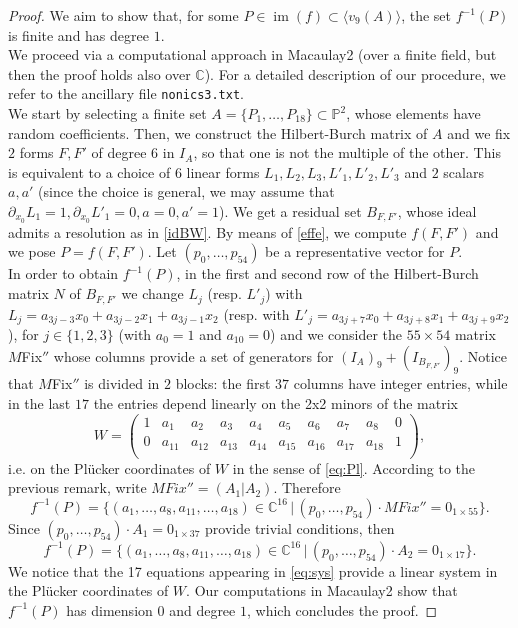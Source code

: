 \documentclass{amsart}
\newcommand{\C}{\mathbb{C}}
\newcommand{\Pj}{\mathbb{P}}
\newcommand{\imm}{\operatorname{im}}
\theoremstyle{definition}
\begin{document}
\begin{proof}
We aim to show that, for some $ P \in \imm(f) \subset \langle v_9(A) \rangle $, the set $ f^{-1}(P) $ is finite and has degree $ 1 $. \\
We proceed via a computational approach in Macaulay2 \cite{Macaulay2} (over a finite field, but then the proof holds
also over $\C$). For a detailed description of our procedure, we refer to the ancillary file \texttt{nonics3.txt}. \\
We start by selecting a finite set $ A = \{P_1,\ldots,P_{18}\} \subset \Pj^2 $, whose elements have random coefficients. 
Then, we construct the Hilbert-Burch matrix of $ A $ and we fix $ 2 $ forms $ F, F' $ of degree $ 6 $ in $ I_{A} $, so that one is not the multiple of the other.
This is equivalent to a choice of $ 6 $ linear forms $ L_{1}, L_{2}, L_{3}, L'_{1}, L'_{2}, L'_{3} $ and $ 2 $ scalars $ a, a' $ 
(since the choice is general, we may assume that $ \partial_{x_{0}} L_{1} = 1, \partial_{x_{0}} L'_{1} = 0, a = 0, a' = 1 $). We get a residual set $ B_{F,F'} $, 
whose ideal admits a resolution as in \eqref{idBW}.
By means of \eqref{effe}, we compute $ f(F,F') $ and we pose $ P = f(F,F') $. Let $ (p_{0}, \ldots, p_{54}) $ be a representative vector for  $ P $. \\
In order to obtain $ f^{-1}(P) $, in the first and second row of the Hilbert-Burch matrix $ N $ of $ B_{F,F'} $ we change $ L_{j} $ (resp. $ L'_{j} $) 
with $ L_{j} = a_{3j-3}x_{0}+a_{3j-2}x_{1}+a_{3j-1}x_{2} $ (resp. with $ L'_{j} = a_{3j+7}x_{0}+ a_{3j+8}x_{1}+a_{3j+9}x_{2} $), for $ j \in \{1,2,3\} $ 
(with $ a_{0} = 1 $ and $ a_{10} = 0 $) and we consider the $ 55\times 54 $ matrix $ M$Fix$'' $ whose columns provide a set of generators  
for $ (I_{A})_{9}+ (I_{B_{F,F'}})_{9} $. 
 Notice that $ M$Fix$''$ is divided in $ 2 $ blocks: the first $ 37 $ columns have integer entries, while in the last $ 17 $ the entries depend linearly 
 on the 2x2 minors of the matrix 
$$ W = \begin{pmatrix}1 & a_{1} & a_{2} & a_{3} & a_{4} & a_{5} & a_{6} & a_{7} & a_{8} & 0 \\
0 & a_{11} & a_{12} & a_{13} & a_{14} & a_{15} & a_{16} & a_{17} & a_{18} & 1 \\ \end{pmatrix}, $$
i.e. on the Pl\"ucker coordinates of $ W $ in the sense of \eqref{eq:Pl}. According to  the previous remark, write $ MFix'' = (A_{1}|A_{2}) $. Therefore 
$$ f^{-1}(P) = \{(a_{1}, \ldots, a_{8}, a_{11},\ldots, a_{18}) \in \C^{16} \, | \, (p_{0}, \ldots, p_{54})\cdot MFix'' = 0_{1 \times 55}\}. $$
Since $ (p_{0}, \ldots, p_{54})\cdot A_{1} = 0_{1 \times 37} $ provide trivial conditions, then 
\begin{equation}\label{eq:sys}
f^{-1}(P) = \{(a_{1}, \ldots, a_{8}, a_{11},\ldots, a_{18}) \in \C^{16} \, | \, (p_{0}, \ldots, p_{54})\cdot A_{2} = 0_{1 \times 17}\}. 
\end{equation}
We notice that the 17 equations  appearing in \eqref{eq:sys} provide a linear system in the  Pl\"ucker coordinates of $ W $. Our  computations in Macaulay2 show that $ f^{-1}(P) $ has dimension $ 0 $ and degree $ 1 $,
which concludes the proof.
\end{proof}
\end{document}
